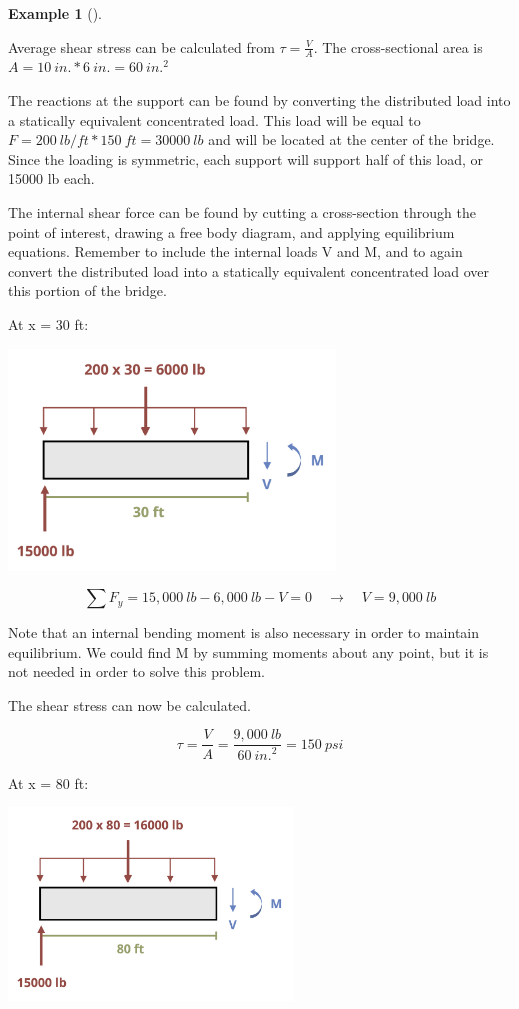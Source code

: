 \documentclass[
  letterpaper,
  DIV=11,
  numbers=noendperiod]{scrreprt}
\theoremstyle{definition}
\newtheorem{example}{Example}[chapter]
\theoremstyle{remark}
\begin{document}
\begin{tcolorbox}
\begin{example}[]
\begin{tcolorbox}
Average shear stress can be calculated from \(\tau=\frac{V}{A}\). The
cross-sectional area is \(A=10{~in.}*6{~in.}=60{~in.}^2\)

The reactions at the support can be found by converting the distributed
load into a statically equivalent concentrated load. This load will be
equal to \(F=200{~lb/ft}*150{~ft}=30000{~lb}\) and will be located at
the center of the bridge. Since the loading is symmetric, each support
will support half of this load, or 15000 lb each.

The internal shear force can be found by cutting a cross-section through
the point of interest, drawing a free body diagram, and applying
equilibrium equations. Remember to include the internal loads V and M,
and to again convert the distributed load into a statically equivalent
concentrated load over this portion of the bridge.

At x = 30 ft:

\begin{center}
\includegraphics[width=3.41667in,height=\textheight]{images/Updated CH2 examples/example 2.3 part 2.png}
\end{center}

\[
\sum F_y=15,000{~lb}-6,000{~lb}-V=0 \quad \rightarrow \quad V=9,000{~lb}
\]

Note that an internal bending moment is also necessary in order to
maintain equilibrium. We could find M by summing moments about any
point, but it is not needed in order to solve this problem.

The shear stress can now be calculated.

\[
\tau=\frac{V}{A}=\frac{9,000{~lb}}{60{~in.}^2}=150{~psi}
\]

At x = 80 ft:

\begin{center}
\includegraphics[width=2.96875in,height=\textheight]{images/Updated CH2 examples/example 2.3 part 3.png}
\end{center}


\end{tcolorbox}
\end{example}
\end{tcolorbox}
\end{document}
